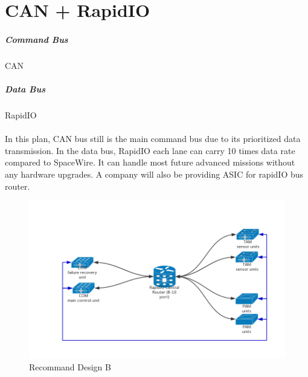 \documentclass[12pt,article]{memoir}
\begin{document}
\section{CAN + RapidIO}
\subparagraph{Command Bus}CAN
\subparagraph{Data Bus}RapidIO\\\\
In this plan, CAN bus still is the main command bus due to its prioritized data transmission. In the data bus, RapidIO each lane can carry 10 times data rate compared to SpaceWire. It can handle most future advanced missions without any hardware upgrades. A company will also be providing ASIC for rapidIO bus router.
\begin{figure}[htp]
\includegraphics[width=\textwidth]{img/DR00001_RapidIO.png}
 \caption{Recommand Design B}	
\end{figure}
\newpage
\end{document}
